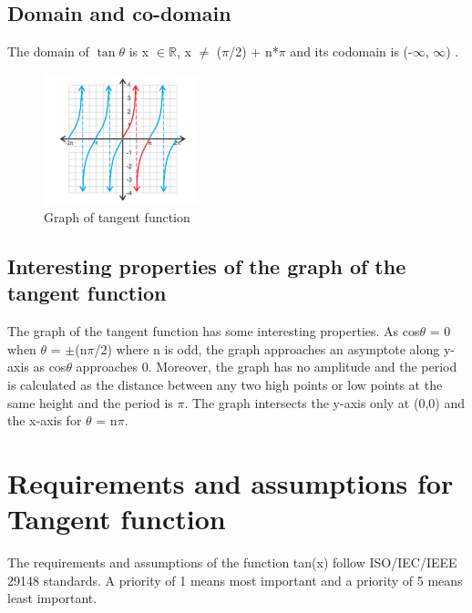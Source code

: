 \documentclass[paper=a4, fontsize=11pt,twoside]{scrartcl}	%
\begin{document}
    \subsection{Domain and co-domain}
    The domain of $\tan \theta$ is x $\in \mathbb{R}$, x $\ne$ ($\pi$/2) + n*$\pi$ and its codomain is (-$\infty$, $\infty$) \cite{tandomainwebsite}.
    \begin{figure} [H]
        \centering
        \includegraphics[width=0.4\textwidth]{graph-of-tangent.png}
        \caption{Graph of tangent function}
        \label{fig:graph_tangent}
    \end{figure} 
    \subsection{Interesting properties of the graph of the tangent function}
    The graph of the tangent function has some interesting properties. As cos$\theta$ = 0 when $\theta$ = $\pm$(n$\pi$/2) where n is odd, the graph approaches an asymptote along y-axis as cos$\theta$ approaches 0. Moreover, the graph has no amplitude and the period is calculated as the distance between any two high points or low points at the same height and the period is $\pi$. The graph intersects the y-axis only at (0,0) and the x-axis for $\theta$ = n$\pi$.
    
    \section{Requirements and assumptions for Tangent function}
The requirements and assumptions of the function tan(x) follow ISO/IEC/IEEE 29148 standards. A priority of 1 means most important and a priority of 5 means least important.
\end{document}

